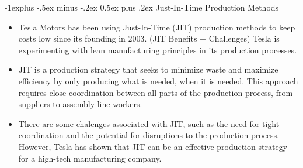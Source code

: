 \documentclass[12pt, landscape]{article}
\makeatletter
\renewcommand{\subsection}{\@startsection{subsection}{2}{0mm}%
                                {-1explus -.5ex minus -.2ex}%
                                {0.5ex plus .2ex}%
                                {\normalfont\normalsize\bfseries}}
\makeatother
\begin{document}
\begin{multicols*}{3}
\subsection{Just-In-Time Production Methods}
\begin{itemize}
\item Tesla Motors has been using Just-In-Time (JIT) production methods to keep costs low since its founding in 2003. (JIT Benefits + Challenges) Tesla is experimenting with lean manufacturing principles in its production processes.
\item JIT is a production strategy that seeks to minimize waste and maximize efficiency by only producing what is needed, when it is needed. This approach requires close coordination between all parts of the production process, from suppliers to assembly line workers.
\item There are some chalenges associated with JIT, such as the need for tight coordination and the potential for disruptions to the production process. However, Tesla has shown that JIT can be an effective production strategy for a high-tech manufacturing company.
\end{itemize}


\end{multicols*}
\end{document}
